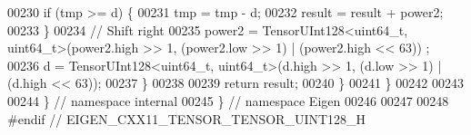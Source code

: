 \begin{DoxyCode}
00230       \textcolor{keywordflow}{if} (tmp >= d) \{
00231         tmp = tmp - d;
00232         result = result + power2;
00233       \}
00234       \textcolor{comment}{// Shift right}
00235       power2 = TensorUInt128<uint64\_t, uint64\_t>(power2.high >> 1, (power2.low >> 1) | (power2.high << 63))
      ;
00236       d = TensorUInt128<uint64\_t, uint64\_t>(d.high >> 1, (d.low >> 1) | (d.high << 63));
00237     \}
00238 
00239     \textcolor{keywordflow}{return} result;
00240   \}
00241 \}
00242 
00243 
00244 \}  \textcolor{comment}{// namespace internal}
00245 \}  \textcolor{comment}{// namespace Eigen}
00246 
00247 
00248 \textcolor{preprocessor}{#endif  // EIGEN\_CXX11\_TENSOR\_TENSOR\_UINT128\_H}
\end{DoxyCode}
